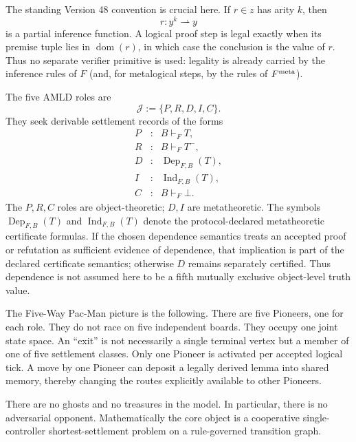 \documentclass[11pt]{article}
\theoremstyle{remark}
\newcommand{\Dep}{\operatorname{Dep}}
\newcommand{\Ind}{\operatorname{Ind}}
\newcommand{\Roles}{\mathcal J}
\begin{document}
The standing Version 48 convention is crucial here. If $r\in z$ has arity $k$, then
\[
r:y^k\rightharpoonup y
\]
is a partial inference function. A logical proof step is legal exactly when its premise tuple lies in $\operatorname{dom}(r)$, in which case the conclusion is the value of $r$. Thus no separate verifier primitive is used: legality is already carried by the inference rules of $F$ (and, for metalogical steps, by the rules of $F^{\rm meta}$).

The five AMLD roles are
\[
\Roles:=\{P,R,D,I,C\}.
\]
They seek derivable settlement records of the forms
\[
\begin{array}{ccl}
P&:&B\vdash_F T,\\
R&:&B\vdash_F T^-,\\
D&:&\Dep_{F,B}(T),\\
I&:&\Ind_{F,B}(T),\\
C&:&B\vdash_F\bot.
\end{array}
\]
The $P,R,C$ roles are object-theoretic; $D,I$ are metatheoretic. The symbols $\Dep_{F,B}(T)$ and $\Ind_{F,B}(T)$ denote the protocol-declared metatheoretic certificate formulas. If the chosen dependence semantics treats an accepted proof or refutation as sufficient evidence of dependence, that implication is part of the declared certificate semantics; otherwise $D$ remains separately certified. Thus dependence is not assumed here to be a fifth mutually exclusive object-level truth value.



The Five-Way Pac-Man picture is the following. There are five Pioneers, one for each role. They do not race on five independent boards. They occupy one joint state space. An ``exit'' is not necessarily a single terminal vertex but a member of one of five settlement classes. Only one Pioneer is activated per accepted logical tick. A move by one Pioneer can deposit a legally derived lemma into shared memory, thereby changing the routes explicitly available to other Pioneers.

There are no ghosts and no treasures in the model. In particular, there is no adversarial opponent. Mathematically the core object is a cooperative single-controller shortest-settlement problem on a rule-governed transition graph.
\end{document}
